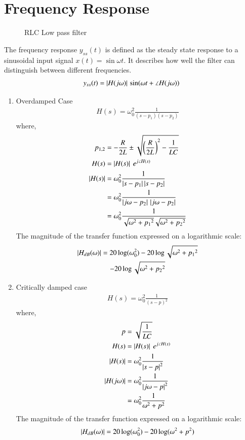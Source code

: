 \documentclass[journal,12pt,twocolumn]{IEEEtran}
\theoremstyle{remark}
\begin{document}
\section{Frequency Response}
\begin{figure}[!ht]
    \centering
    
    \caption{RLC Low pass filter}
\end{figure}
The frequency response $y_{ss}(t)$ is defined as the steady state response to a sinusoidal input signal $x(t) = \sin{\omega t}$. It describes how well the filter can distinguish between different frequencies.
\begin{align}
y_{ss}(t)=\left\vert H(j\omega)\right\vert\,\sin(\omega t+\angle H(j\omega))
\end{align}
\begin{enumerate}
    \item Overdamped Case
    \begin{align}
        H(s)=\omega_0^2\frac{1}{(s-p_1)(s-p_2)}
    \end{align}
    where,
    \begin{align}
        p_{1,2} &= -\frac{R}{2L} \pm \sqrt{\left(\frac{R}{2L}\right)^2-\frac{1}{LC}}\\
         H(s) &= \left\vert H(s)\right\vert\ e^{j\angle{H(s)}}\\
         \left\vert H(s)\right\vert &= \omega_0^2 \frac{1}{\left\vert s-p_1\right\vert\left\vert s-p_2\right\vert}\\
         &=\omega_0^2\frac{1}{\left|j\omega-p_2\right|\,\left|j\omega-p_2\right|} \\
         &= \omega_0^2 \frac{1}{\sqrt{\omega^2+{p_1}^2}\sqrt{\omega^2+{p_2}^2}}
    \end{align}
    The magnitude of the transfer function expressed on a logarithmic scale:
    \begin{multline}
        \left\vert H_{dB}(\omega)\right\vert = 20\log(\omega_0^2) -20\log\sqrt{\omega^2+{p_1}^2}  \\
        -20\log\sqrt{\omega^2+{p_2}^2}
    \end{multline}

    \item Critically damped case
    \begin{align}
        H(s)=\omega_0^2\frac{1}{(s-p)^2}
    \end{align}
    where,
    \begin{align}
        p &=\sqrt{\frac{1}{LC}}\\
        H(s) &= \left\vert H(s)\right\vert\ e^{j\angle{H(s)}}\\
        \left\vert H(s)\right\vert &= \omega_0^2 \frac{1}{\left\vert s-p\right\vert^2}\\
        \left\vert H(j\omega)\right\vert &=\omega_0^2 \frac{1}{\left\vert j\omega-p\right\vert^2}\\
        &=\omega_0^2\frac{1}{\omega^2+p^2}
    \end{align}
    The magnitude of the transfer function expressed on a logarithmic scale:
    \begin{align}
        \left\vert H_{dB}(\omega)\right\vert = 20\log(\omega_0^2) -20\log(\omega^2+{p}^2)
    \end{align}


\end{enumerate}
\end{document}
